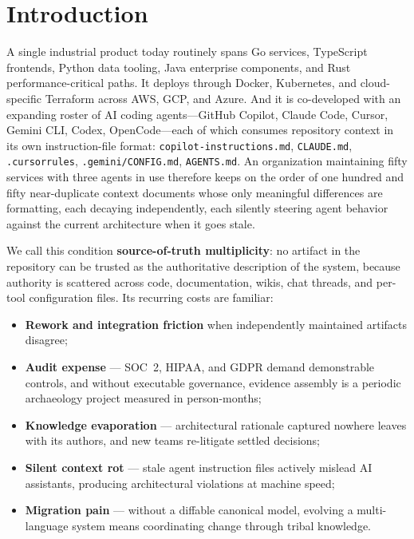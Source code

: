 \documentclass[sigconf,nonacm]{acmart}
\begin{document}

\maketitle

\section{Introduction}
\label{sec:intro}

A single industrial product today routinely spans Go services, TypeScript frontends, Python data tooling, Java enterprise components, and Rust performance-critical paths. It deploys through Docker, Kubernetes, and cloud-specific Terraform across AWS, GCP, and Azure. And it is co-developed with an expanding roster of AI coding agents---GitHub Copilot, Claude Code, Cursor, Gemini CLI, Codex, OpenCode---each of which consumes repository context in its own instruction-file format: \texttt{copilot-instructions.md}, \texttt{CLAUDE.md}, \texttt{.cursorrules}, \texttt{.gemini/CONFIG.md}, \texttt{AGENTS.md}. An organization maintaining fifty services with three agents in use therefore keeps on the order of one hundred and fifty near-duplicate context documents whose only meaningful differences are formatting, each decaying independently, each silently steering agent behavior against the current architecture when it goes stale.

We call this condition \textbf{source-of-truth multiplicity}: no artifact in the repository can be trusted as the authoritative description of the system, because authority is scattered across code, documentation, wikis, chat threads, and per-tool configuration files. Its recurring costs are familiar:
\begin{itemize}
  \item \textbf{Rework and integration friction} when independently maintained artifacts disagree;
  \item \textbf{Audit expense} --- SOC~2, HIPAA, and GDPR demand demonstrable controls, and without executable governance, evidence assembly is a periodic archaeology project measured in person-months;
  \item \textbf{Knowledge evaporation} --- architectural rationale captured nowhere leaves with its authors, and new teams re-litigate settled decisions;
  \item \textbf{Silent context rot} --- stale agent instruction files actively mislead AI assistants, producing architectural violations at machine speed;
  \item \textbf{Migration pain} --- without a diffable canonical model, evolving a multi-language system means coordinating change through tribal knowledge.
\end{itemize}
\end{document}
